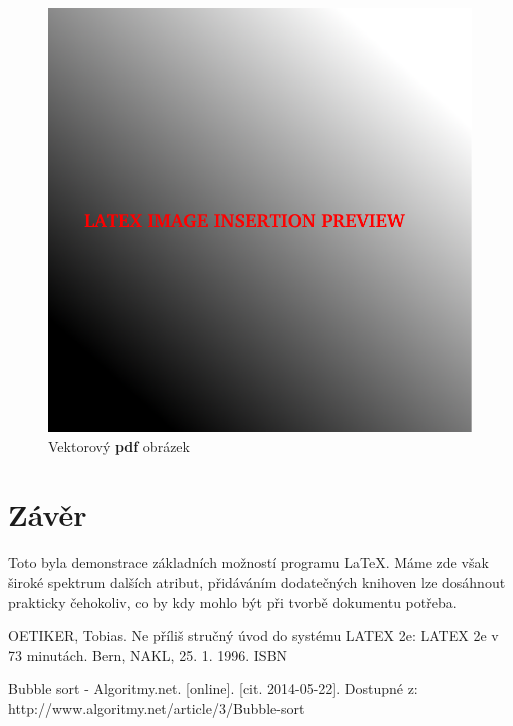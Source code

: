 \documentclass[a4paper,11pt]{article}
\begin{document}
\begin{figure}
\centering
\includegraphics[scale=0.4,natwidth=400,natheight=400]{preview.pdf}
\caption{Vektorový \textbf{pdf} obrázek}
\label{fig:obrpdf}
\end{figure}


\section{Závěr}
Toto byla demonstrace základních možností programu \LaTeX . Máme zde však široké spektrum dalších atribut, přidáváním dodatečných knihoven lze dosáhnout prakticky čehokoliv, co by kdy mohlo být při tvorbě dokumentu potřeba.

\begin{thebibliography}{100}

	 OETIKER, Tobias. Ne příliš stručný úvod do systému LATEX 2e: LATEX 2e v 73 minutách. Bern, NAKL, 25. 1. 1996. ISBN

	 Bubble sort - Algoritmy.net. [online]. [cit. 2014-05-22]. Dostupné z: http://www.algoritmy.net/article/3/Bubble-sort 

\end{thebibliography}
\end{document}
